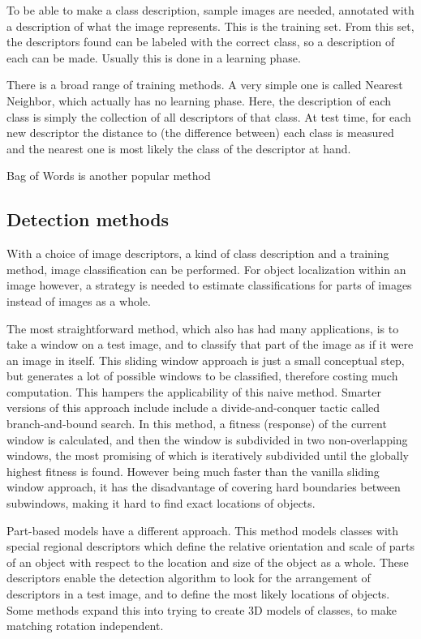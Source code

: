 \documentclass[a4paper,10pt]{article}
\begin{document}
To be able to make a class description, sample images are needed, annotated with a description of what the image represents. This is the training set. From this set, the descriptors found can be labeled with the correct class, so a description of each can be made. Usually this is done in a learning phase.

There is a broad range of training methods. A very simple one is called Nearest Neighbor, which actually has no learning phase. Here, the description of each class is simply the collection of all descriptors of that class. At test time, for each new descriptor the distance to (the difference between) each class is measured and the nearest one is most likely the class of the descriptor at hand. \cite{boiman2008defense}

Bag of Words is another popular method \cite{lazebnik2006beyond, van2011exploiting} 

\subsection{Detection methods} %
\label{sub:detection_methods}
With a choice of image descriptors, a kind of class description and a training method, image classification can be performed. For object localization within an image however, a strategy is needed to estimate classifications for parts of images instead of images as a whole.

The most straightforward method, which also has had many applications, is to take a window on a test image, and to classify that part of the image as if it were an image in itself. This sliding window approach  is just a small conceptual step, but generates a lot of possible windows to be classified, therefore costing much computation. This hampers the applicability of this naive method. Smarter versions of this approach include include a divide-and-conquer tactic called branch-and-bound search. \cite{lampert2008beyond} In this method, a fitness (response) of the current window is calculated, and then the window is subdivided in two non-overlapping windows, the most promising of which is iteratively subdivided until the globally highest fitness is found. However being much faster than the vanilla sliding window approach, it has the disadvantage of covering hard boundaries between subwindows, making it hard to find exact locations of objects.

Part-based models have a different approach. This method models classes with special regional descriptors which define the relative orientation and scale of parts of an object with respect to the location and size of the object as a whole. \cite{leibe2004combined, chum2007exemplar, felzenszwalb2010object} These descriptors enable the detection algorithm to look for the arrangement of descriptors in a test image, and to define the most likely locations of objects. Some methods expand this into trying to create 3D models of classes, to make matching rotation independent. 
\end{document}
